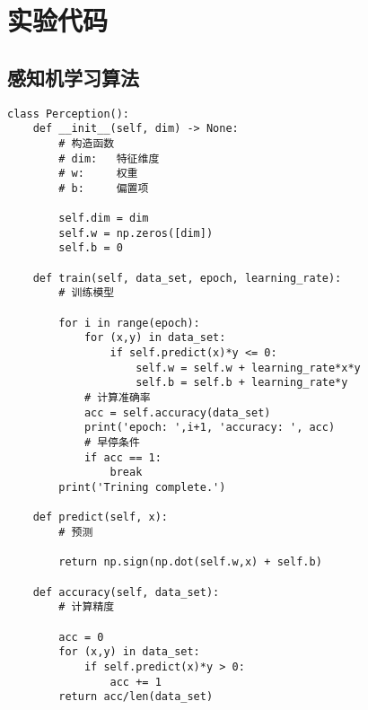 \section{实验代码}

\subsection{感知机学习算法}

\begin{lstlisting}[caption = 感知机原型算法实现]
	class Perception():
    def __init__(self, dim) -> None:
        # 构造函数
        # dim:   特征维度
        # w:     权重
        # b:     偏置项

        self.dim = dim
        self.w = np.zeros([dim])
        self.b = 0
    
    def train(self, data_set, epoch, learning_rate):
        # 训练模型

        for i in range(epoch):
            for (x,y) in data_set:
                if self.predict(x)*y <= 0:
                    self.w = self.w + learning_rate*x*y
                    self.b = self.b + learning_rate*y
            # 计算准确率
            acc = self.accuracy(data_set)
            print('epoch: ',i+1, 'accuracy: ', acc)
            # 早停条件
            if acc == 1:
                break
        print('Trining complete.')

    def predict(self, x):
        # 预测

        return np.sign(np.dot(self.w,x) + self.b)
    
    def accuracy(self, data_set):
        # 计算精度
        
        acc = 0
        for (x,y) in data_set:
            if self.predict(x)*y > 0:
                acc += 1
        return acc/len(data_set)
\end{lstlisting}

